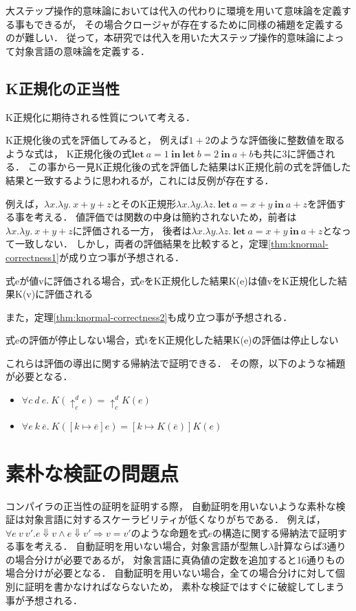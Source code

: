 \documentclass{sumiilab-paper}
\newcommand{\keyword}[1]{\mathbf{#1}}
\newcommand{\LET}{\keyword{let}}
\newcommand{\IN}{\keyword{in}}
\begin{document}
大ステップ操作的意味論においては代入の代わりに環境を用いて意味論を定義する事もできるが，
その場合クロージャが存在するために同様の補題を定義するのが難しい．
従って，本研究では代入を用いた大ステップ操作的意味論によって対象言語の意味論を定義する．

\subsection{K正規化の正当性}
K正規化に期待される性質について考える．

K正規化後の式を評価してみると，
例えば$1+2$のような評価後に整数値を取るような式は，
K正規化後の式$\LET~a = 1~\IN~\LET~b = 2~\IN~a + b$も共に3に評価される．
この事から一見K正規化後の式を評価した結果はK正規化前の式を評価した結果と一致するように思われるが，これには反例が存在する．

例えば，$\lambda x.\lambda y.~x+y+z$とそのK正規形$\lambda x.\lambda y.\lambda z.~\LET~a = x+y~\IN~a + z$を評価する事を考える．
値評価では関数の中身は簡約されないため，前者は$\lambda x.\lambda y.~x+y+z$に評価される一方，
後者は$\lambda x.\lambda y.\lambda z.~\LET~a = x+y~\IN~a + z$となって一致しない．
しかし，両者の評価結果を比較すると，定理\ref{thm:knormal-correctness1}が成り立つ事が予想される．
\begin{theorem}\label{thm:knormal-correctness1}
	式eが値vに評価される場合，式eをK正規化した結果K(e)は値vをK正規化した結果K(v)に評価される
\end{theorem}
また，定理\ref{thm:knormal-correctness2}も成り立つ事が予想される．
\begin{theorem}\label{thm:knormal-correctness2}
	式eの評価が停止しない場合，式tをK正規化した結果K(e)の評価は停止しない
\end{theorem}
これらは評価の導出に関する帰納法で証明できる．
その際，以下のような補題が必要となる．

\begin{itemize}
	\item $\forall c~d~e.~K(\uparrow^d_c e) = \uparrow^d_c K(e)$
	\item $\forall e~k~\overline{e}.~K([k \mapsto \overline{e}]e)=[k \mapsto K(\overline{e})]K(e)$
\end{itemize}

\section{素朴な検証の問題点}
コンパイラの正当性の証明を証明する際，
自動証明を用いないような素朴な検証は対象言語に対するスケーラビリティが低くなりがちである．
例えば，$\forall e~v~v'.e\Downarrow v \land e\Downarrow v' \Longrightarrow v = v'$のような命題を式$e$の構造に関する帰納法で証明する事を考える．
自動証明を用いない場合，対象言語が型無し$\lambda$計算ならば3通りの場合分けが必要であるが，
対象言語に真偽値の定数を追加すると16通りもの場合分けが必要となる．
自動証明を用いない場合，全ての場合分けに対して個別に証明を書かなければならないため，
素朴な検証ではすぐに破綻してしまう事が予想される．
\end{document}

